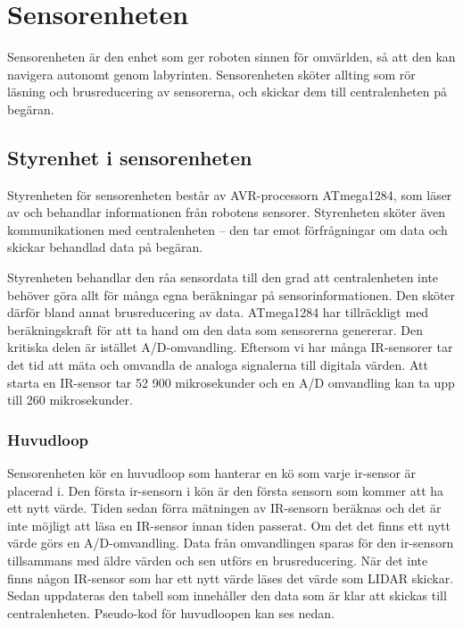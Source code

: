 \documentclass[a4paper,titlepage,12pt]{article}
\begin{document}
	\section{Sensorenheten}
	Sensorenheten är den enhet som ger roboten sinnen för omvärlden, så att den
	kan navigera autonomt genom labyrinten. Sensorenheten sköter allting som
    rör läsning och brusreducering av sensorerna, och skickar dem till
    centralenheten på begäran.

	\subsection{Styrenhet i sensorenheten}
	Styrenheten för sensorenheten består av AVR-processorn ATmega1284, som läser av och 
	behandlar informationen från robotens sensorer. Styrenheten sköter även
	kommunikationen med centralenheten -- den tar emot förfrågningar om data och
	skickar behandlad data på begäran.

	Styrenheten behandlar den råa sensordata till den grad att
	centralenheten inte behöver göra allt för många egna beräkningar på
	sensorinformationen. Den sköter därför bland annat brusreducering av
	data. ATmega1284 har tillräckligt med 
	beräkningskraft för att ta hand om den data som sensorerna genererar. Den kritiska 
	delen är istället A/D-omvandling. Eftersom vi har många IR-sensorer tar det tid att 
	mäta och omvandla de analoga signalerna till digitala värden. Att starta en IR-sensor 
	tar 52 900 mikrosekunder och en A/D omvandling kan ta upp till 260 mikrosekunder. 

    \subsubsection{Huvudloop}
    Sensorenheten kör en huvudloop som hanterar en kö som varje ir-sensor är placerad 
    i. Den första ir-sensorn i kön är den första sensorn som kommer att ha ett nytt 
    värde. Tiden sedan förra mätningen av IR-sensorn beräknas och det är inte 
    möjligt att läsa en IR-sensor innan tiden passerat. Om det det finns ett nytt värde 
    görs en A/D-omvandling. Data från omvandlingen sparas för den ir-sensorn 
    tillsammans med äldre värden och sen utförs en brusreducering. När det inte finns 
    någon IR-sensor som har ett nytt värde läses det värde som LIDAR skickar. Sedan 
    uppdateras den tabell som innehåller den data som är klar att skickas till 
    centralenheten. Pseudo-kod för huvudloopen kan ses nedan. 
    
\end{document}
